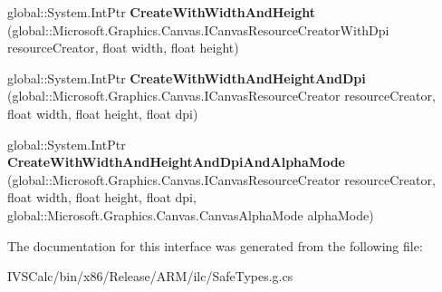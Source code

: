 \begin{DoxyCompactItemize}
global\+::\+System.\+Int\+Ptr {\bfseries Create\+With\+Width\+And\+Height} (global\+::\+Microsoft.\+Graphics.\+Canvas.\+I\+Canvas\+Resource\+Creator\+With\+Dpi resource\+Creator, float width, float height)
\item 
\mbox{\label{interface_microsoft_1_1_graphics_1_1_canvas_1_1_u_i_1_1_xaml_1_1_i_canvas_image_source_factory_a6cfd3bc04a35df5bd6c867d8ded122c0}} 
global\+::\+System.\+Int\+Ptr {\bfseries Create\+With\+Width\+And\+Height\+And\+Dpi} (global\+::\+Microsoft.\+Graphics.\+Canvas.\+I\+Canvas\+Resource\+Creator resource\+Creator, float width, float height, float dpi)
\item 
\mbox{\label{interface_microsoft_1_1_graphics_1_1_canvas_1_1_u_i_1_1_xaml_1_1_i_canvas_image_source_factory_a7f81e40660e111a979eb5fc6d370cce8}} 
global\+::\+System.\+Int\+Ptr {\bfseries Create\+With\+Width\+And\+Height\+And\+Dpi\+And\+Alpha\+Mode} (global\+::\+Microsoft.\+Graphics.\+Canvas.\+I\+Canvas\+Resource\+Creator resource\+Creator, float width, float height, float dpi, global\+::\+Microsoft.\+Graphics.\+Canvas.\+Canvas\+Alpha\+Mode alpha\+Mode)
\end{DoxyCompactItemize}


The documentation for this interface was generated from the following file\+:\begin{DoxyCompactItemize}
\item 
I\+V\+S\+Calc/bin/x86/\+Release/\+A\+R\+M/ilc/Safe\+Types.\+g.\+cs\end{DoxyCompactItemize}
